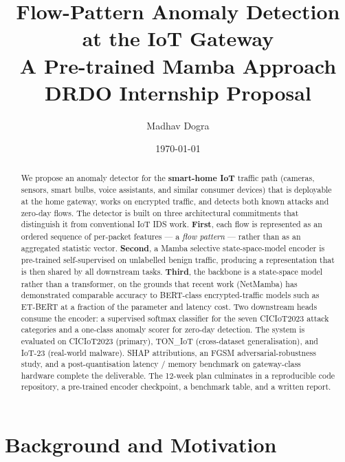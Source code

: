 \documentclass[11pt,a4paper]{article}
\title{\textbf{Flow-Pattern Anomaly Detection at the IoT Gateway} \\[0.5em]
       \large A Pre-trained Mamba Approach \\[0.3em]
       \normalsize DRDO Internship Proposal}
\author{Madhav Dogra}
\date{\today}
\begin{document}
\maketitle
\thispagestyle{empty}

\begin{abstract}
\noindent
We propose an anomaly detector for the \textbf{smart-home IoT} traffic path (cameras, sensors, smart bulbs, voice assistants, and similar consumer devices) that is deployable at the home gateway, works on encrypted traffic, and detects both known attacks and zero-day flows. The detector is built on three architectural commitments that distinguish it from conventional IoT IDS work. \textbf{First}, each flow is represented as an ordered sequence of per-packet features --- a \emph{flow pattern} --- rather than as an aggregated statistic vector. \textbf{Second}, a Mamba selective state-space-model encoder is pre-trained self-supervised on unlabelled benign traffic, producing a representation that is then shared by all downstream tasks. \textbf{Third}, the backbone is a state-space model rather than a transformer, on the grounds that recent work (NetMamba) has demonstrated comparable accuracy to BERT-class encrypted-traffic models such as ET-BERT at a fraction of the parameter and latency cost. Two downstream heads consume the encoder: a supervised softmax classifier for the seven CICIoT2023 attack categories and a one-class anomaly scorer for zero-day detection. The system is evaluated on CICIoT2023 (primary), TON\_IoT (cross-dataset generalisation), and IoT-23 (real-world malware). SHAP attributions, an FGSM adversarial-robustness study, and a post-quantisation latency / memory benchmark on gateway-class hardware complete the deliverable. The 12-week plan culminates in a reproducible code repository, a pre-trained encoder checkpoint, a benchmark table, and a written report.
\end{abstract}

\section{Background and Motivation}
\end{document}
